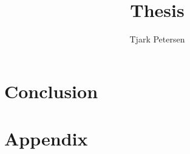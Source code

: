 \documentclass[11pt,a4paper]{report}
\author{Tjark Petersen}
\title{Thesis}
\begin{document}
\maketitle



\chapter{Conclusion} %

\printbibliography


\chapter{Appendix} %


\end{document}
